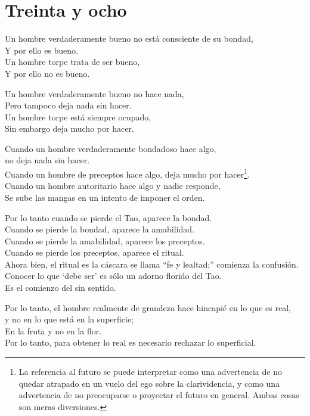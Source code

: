 \documentclass[hidelinks]{memoir}
\begin{document}
	\chapter*{Treinta y ocho}
	
	Un hombre verdaderamente bueno no está consciente de su bondad,\\
	Y por ello es bueno.\\
	Un hombre torpe trata de ser bueno,\\
	Y por ello no es bueno.
	
	Un hombre verdaderamente bueno no hace nada,\\
	Pero tampoco deja nada sin hacer.\\
	Un hombre torpe está siempre ocupado,\\
	Sin embargo deja mucho por hacer.
	
	Cuando un hombre verdaderamente bondadoso hace algo,\\
	no deja nada sin hacer.\\
	Cuando un hombre de preceptos hace algo, deja mucho por hacer\footnote{La referencia al futuro se puede interpretar como una advertencia de no
		quedar atrapado en un vuelo del ego sobre la clarividencia, y como una
		advertencia de no preocuparse o proyectar el futuro en general. Ambas
		cosas son meras diversiones.}.\\
	Cuando un hombre autoritario hace algo y nadie responde,\\
	Se sube las mangas en un intento de imponer el orden.
	
	Por lo tanto cuando se pierde el Tao, aparece la bondad.\\
	Cuando se pierde la bondad, aparece la amabilidad.\\
	Cuando se pierde la amabilidad, aparece los preceptos.\\
	Cuando se pierde los preceptos, aparece el ritual.\\
	Ahora bien, el ritual es la cáscara se llama ``fe y lealtad;'' comienza
	la confusión.\\
	Conocer lo que `debe ser' es sólo un adorno florido del Tao.\\
	Es el comienzo del sin sentido.
	
	Por lo tanto, el hombre realmente de grandeza hace hincapié en lo que es
	real,\\
	y no en lo que está en la superficie;\\
	En la fruta y no en la flor.\\
	Por lo tanto, para obtener lo real es necesario rechazar lo superficial.
	
\end{document}
